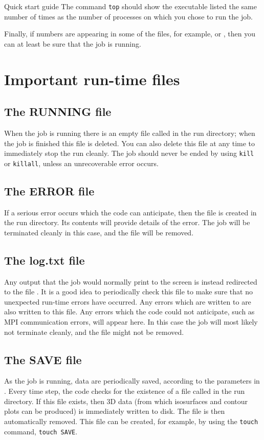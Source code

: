 \begin{chapter}{\label{cha:quickstart} Quick start guide}
  The command \verb"top" should show the  executable listed the
  same number of times as the number of processes on which you chose to run the
  job.

  Finally, if numbers are appearing in some of the  files, for
  example,  or , then you can at
  least be sure that the job is running.

  \section{Important run-time files}
  \subsection{The RUNNING file}
  When the job is running there is an empty file called  in
  the run directory; when the job is finished this file is deleted.  You can
  also delete this file at any time to immediately stop the run cleanly.  The
  job should never be ended by using \verb"kill" or \verb"killall", unless an
  unrecoverable error occurs.

  \subsection{The ERROR file}
  If a serious error occurs which the code can anticipate, then the
   file is created in the run directory.  Its contents will
  provide details of the error.  The job will be terminated cleanly in this
  case, and the  file will be removed.

  \subsection{The log.txt file}
  Any output that the job would normally print to the screen is instead
  redirected to the file .  It is a good idea to periodically
  check this file to make sure that no unexpected run-time errors have
  occurred.  Any errors which are written to  are also written
  to this file.  Any errors which the code could not anticipate, such as MPI
  communication errors, will appear here.  In this case the job will most
  likely not terminate cleanly, and the  file might not be
  removed.

  \subsection{The SAVE file}
  As the job is running, data are periodically saved, according to the
   parameters in .  Every time step, the
  code checks for the existence of a file called  in the run
  directory.  If this file exists, then 3D data (from which isosurfaces and
  contour plots can be produced) is immediately written to disk.  The
   file is then automatically removed.  This file can be created,
  for example, by using the \verb"touch" command, \ie \verb"touch SAVE".


\end{chapter}

